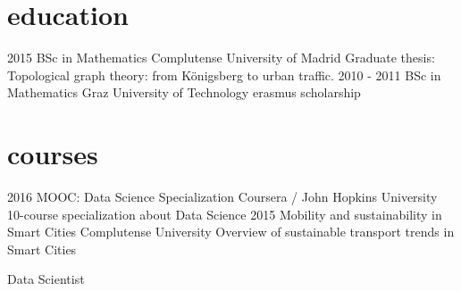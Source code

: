 \documentclass[]{friggeri-cv}
\begin{document}
\section{education}

\begin{entrylist}
  \entry
    {2015}
    {BSc in Mathematics}
    {Complutense University of Madrid}
    {Graduate thesis: Topological graph theory: from Königsberg to urban traffic.}
  \entry
    {2010 - 2011}
    {BSc in Mathematics}
    {Graz University of Technology}
    {erasmus scholarship}
\end{entrylist}

\section{courses}

\begin{entrylist}
  \entry
    {2016}
    {MOOC: Data Science Specialization}
    {Coursera / John Hopkins University}
    {10-course specialization about Data Science}
  \entry
    {2015}
    {Mobility and sustainability in Smart Cities}
    {Complutense University}
    {Overview of sustainable transport trends in Smart Cities}
\end{entrylist}




\else 

       {Data Scientist}
\end{document}
